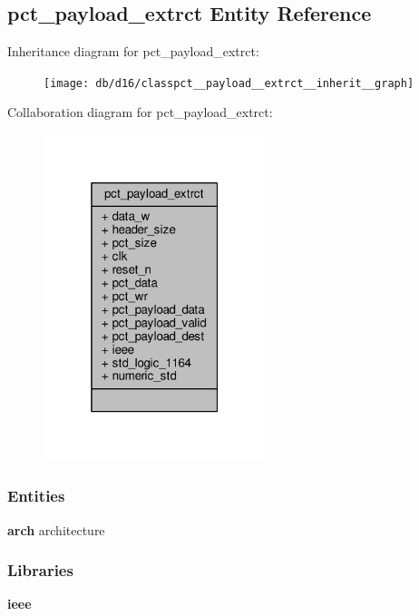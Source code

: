 \subsection{pct\+\_\+payload\+\_\+extrct Entity Reference}
\label{classpct__payload__extrct}


Inheritance diagram for pct\+\_\+payload\+\_\+extrct\+:\nopagebreak
\begin{figure}[H]
\begin{center}
\leavevmode
\texttt{[image: db/d16/classpct\_\_payload\_\_extrct\_\_inherit\_\_graph]}
\end{center}
\end{figure}


Collaboration diagram for pct\+\_\+payload\+\_\+extrct\+:\nopagebreak
\begin{figure}[H]
\begin{center}
\leavevmode
\includegraphics[width=184pt]{d6/d9f/classpct__payload__extrct__coll__graph}
\end{center}
\end{figure}
\subsubsection*{Entities}
\begin{DoxyCompactItemize}
\item 
{\bf arch} architecture
\end{DoxyCompactItemize}
\subsubsection*{Libraries}
 \begin{DoxyCompactItemize}
\item 
{\bf ieee} 
\end{DoxyCompactItemize}
